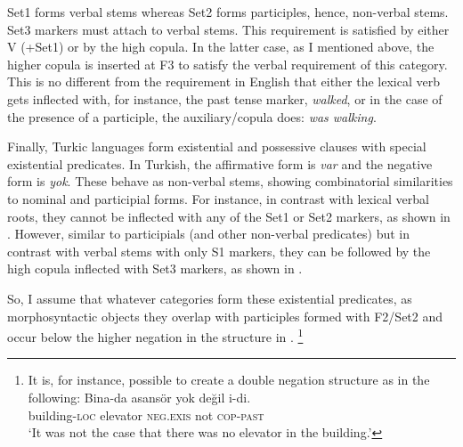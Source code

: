\documentclass[output=paper]{langsci/langscibook}
\begin{document}
Set1 forms verbal stems whereas Set2 forms participles, hence, non-verbal stems. 
Set3 markers must attach to verbal stems. 
This requirement is satisfied by either V (+Set1) or by the high copula. 
In the latter case, as I mentioned above, the higher copula is inserted at F3 to satisfy the verbal requirement of this category. 
This is no different from the requirement in English that either the lexical verb gets inflected with, 
for instance, the past tense marker, \textit{walked}, 
or in the case of the presence of a participle, the auxiliary/copula does: \textit{was walking}. 

Finally, Turkic languages form existential and possessive clauses with special existential predicates. 
In Turkish, the affirmative form is \textit{var} and the negative form is \textit{yok}. 
These behave as non-verbal stems, showing combinatorial similarities to nominal and participial forms. 
For instance, in contrast with lexical verbal roots, they cannot be inflected with any of the Set1 or Set2 markers, as shown in . 
However, similar to participials (and other non-verbal predicates) but in contrast with verbal stems with only S1 markers, 
they can be followed by the high copula inflected with Set3 markers, as shown in .

\ea%
    \label{kelepirex:key:10}
    \z 
\z 

So, I assume that whatever categories form these existential predicates, as morphosyntactic objects they overlap with participles 
formed with F2/Set2 and occur below the higher negation in the structure in .%
\footnote{%
    It is, for instance, possible to create a double negation structure as in the following:
    \ea
        \gll Bina-da asansör yok değil i-di.\\
        building-\textsc{loc} elevator \textsc{neg.exıs} not \textsc{cop}{}-\textsc{past}\\
        \glt `It was not the case that there was no elevator in the building.'
    \z
} 
\end{document}
